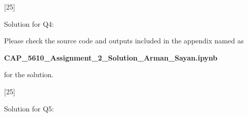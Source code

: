 \documentclass[12pt,letterpaper, onecolumn]{exam}
\begin{document}
\begin{questions}
    [25]

    Solution for Q4:





    \begin{solution}

        Please check the source code and outputs included in the appendix named as

        \begin{center}
            \textbf{CAP\_5610\_Assignment\_2\_Solution\_Arman\_Sayan.ipynb}
        \end{center}
        
        for the solution.
    \end{solution}

    \pagebreak

    [25]

    Solution for Q5:




\end{questions}
\end{document}
